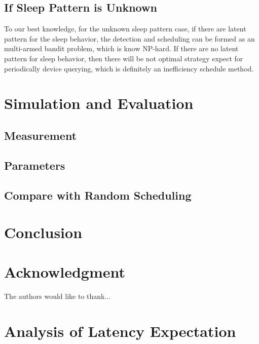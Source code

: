 \documentclass[conference]{IEEEtran}
\begin{document}
\subsection{If Sleep Pattern is Unknown}
To our best knowledge, for the unknown sleep pattern case, if there are latent pattern for the sleep behavior, the detection and scheduling can be formed as an multi-armed bandit problem, which is know NP-hard. If there are no latent pattern for sleep behavior, then there will be not optimal strategy expect for periodically device querying, which is definitely an inefficiency schedule method. 


\section{Simulation and Evaluation}


\subsection{Measurement}

\subsection{Parameters}

\subsection{Compare with Random Scheduling}


\section{Conclusion}


\section*{Acknowledgment}


The authors would like to thank...


\ifCLASSOPTIONcaptionsoff
  \newpage
\fi





%
%
%
%

\appendices
\section{Analysis of Latency Expectation}
\end{document}
